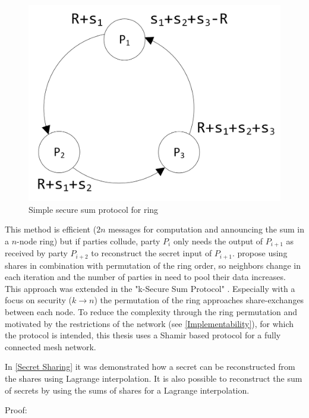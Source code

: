 		\begin{figure}[!htb] %
		\caption{Simple secure sum protocol for ring} \label{figure:smpc sum ring}
		\includegraphics[scale=1.0]{figures/smpc-sum-simple-ring.png}
		\end{figure}
		
		This method is efficient ($2n$ messages for computation and announcing the sum in a $n$-node ring) but if parties collude, party $P_i$ only needs the output of $P_{i+1}$ as received by party $P_{i+2}$ to reconstruct the secret input of $P_{i+1}$. \textcite{Clifton2002} propose using shares in combination with permutation of the ring order, so neighbors change in each iteration and the number of parties in need to pool their data increases. This approach was extended in the "k-Secure Sum Protocol" \autocite{Sheikh2009}. Especially with a focus on security ($k\rightarrow n$) the permutation of the ring approaches share-exchanges between each node. To reduce the complexity through the ring permutation and motivated by the restrictions of the network (see \ref{Implementability}), for which the protocol is intended, this thesis  uses a Shamir based protocol for a fully connected mesh network. 
		
		In \ref{Secret Sharing} it was demonstrated how a secret can be reconstructed from the shares using Lagrange interpolation. It is also possible to reconstruct the sum of secrets by using the sums of shares for a Lagrange interpolation.
		
		Proof:
		
